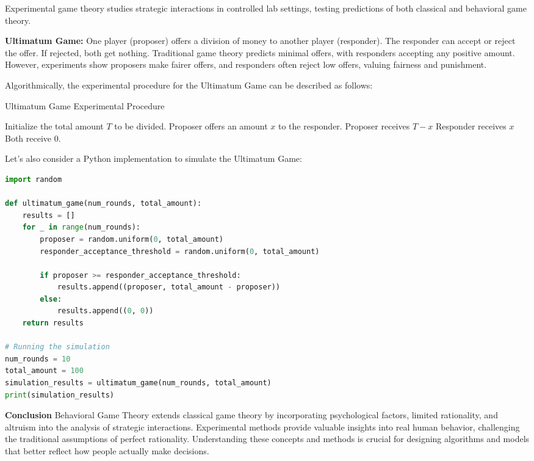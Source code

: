 \documentclass[12pt]{book} %
\begin{document}
Experimental game theory studies strategic interactions in controlled lab settings, testing predictions of both classical and behavioral game theory.

\textbf{Ultimatum Game:} One player (proposer) offers a division of money to another player (responder). The responder can accept or reject the offer. If rejected, both get nothing. Traditional game theory predicts minimal offers, with responders accepting any positive amount. However, experiments show proposers make fairer offers, and responders often reject low offers, valuing fairness and punishment.

Algorithmically, the experimental procedure for the Ultimatum Game can be described as follows:

\begin{algorithm}
\caption{Ultimatum Game Experimental Procedure}
\begin{algorithmic}[1]
\State Initialize the total amount \( T \) to be divided.
    \State Proposer offers an amount \( x \) to the responder.
        \State Proposer receives \( T - x \)
        \State Responder receives \( x \)
    \Else
        \State Both receive 0.
    \EndIf
\EndFor
\end{algorithmic}
\end{algorithm}

\FloatBarrier

Let's also consider a Python implementation to simulate the Ultimatum Game:
\FloatBarrier 
\begin{lstlisting}[language=Python, caption=Ultimatum Game Simulation]
import random

def ultimatum_game(num_rounds, total_amount):
    results = []
    for _ in range(num_rounds):
        proposer = random.uniform(0, total_amount)
        responder_acceptance_threshold = random.uniform(0, total_amount)
        
        if proposer >= responder_acceptance_threshold:
            results.append((proposer, total_amount - proposer))
        else:
            results.append((0, 0))
    return results

# Running the simulation
num_rounds = 10
total_amount = 100
simulation_results = ultimatum_game(num_rounds, total_amount)
print(simulation_results)
\end{lstlisting}

\FloatBarrier

\textbf{Conclusion}
Behavioral Game Theory extends classical game theory by incorporating psychological factors, limited rationality, and altruism into the analysis of strategic interactions. Experimental methods provide valuable insights into real human behavior, challenging the traditional assumptions of perfect rationality. Understanding these concepts and methods is crucial for designing algorithms and models that better reflect how people actually make decisions.
\end{document}
